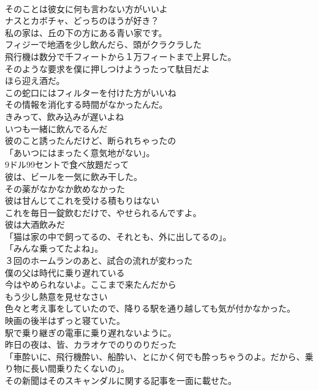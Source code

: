 \documentclass[8pt]{extreport}
\begin{document}
\begin{CJK}{UTF8}{min}
\\	そのことは彼女に何も言わない方がいいよ	
\\	ナスとカボチャ、どっちのほうが好き？	
\\	私の家は、丘の下の方にある青い家です。	
\\	フィジーで地酒を少し飲んだら、頭がクラクラした	
\\	飛行機は数分で千フィートから１万フィートまで上昇した。	
\\	そのような要求を僕に押しつけようったって駄目だよ	
\\	ほら迎え酒だ。	
\\	この蛇口にはフィルターを付けた方がいいね	
\\	その情報を消化する時間がなかったんだ。	
\\	きみって、飲み込みが遅いよね	
\\	いつも一緒に飲んでるんだ	
\\	彼のこと誘ったんだけど、断られちゃったの	
\\	「あいつにはまったく意気地がない」。	
\\	9ドル99セントで食べ放題だって	
\\	彼は、ビールを一気に飲み干した。	
\\	その薬がなかなか飲めなかった	
\\	彼は甘んじてこれを受ける積もりはない	
\\	これを毎日一錠飲むだけで、やせられるんですよ。	
\\	彼は大酒飲みだ	
\\	「猫は家の中で飼ってるの、それとも、外に出してるの」。	
\\	「みんな乗ってたよね」。	
\\	３回のホームランのあと、試合の流れが変わった	
\\	僕の父は時代に乗り遅れている	
\\	今はやめられないよ。ここまで来たんだから	
\\	もう少し熱意を見せなさい	
\\	色々と考え事をしていたので、降りる駅を通り越しても気が付かなかった。	
\\	映画の後半はずっと寝ていた。	
\\	駅で乗り継ぎの電車に乗り遅れないように。	
\\	昨日の夜は、皆、カラオケでのりのりだった	
\\	「車酔いに、飛行機酔い、船酔い、とにかく何でも酔っちゃうのよ。だから、乗り物に長い間乗りたくないの」。	
\\	その新聞はそのスキャンダルに関する記事を一面に載せた。	

\end{CJK}
\end{document}
